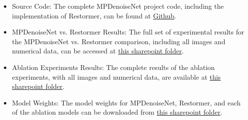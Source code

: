 \begin{itemize}[leftmargin=*]
    \item Source Code: The complete MPDenoiseNet project code, including the implementation of Restormer, can be found at \href{https://github.com/mostafa-k-m/seasalt}{Github}.
    \item MPDenoiseNet vs. Restormer Results: The full set of experimental results for the MPDenoiseNet vs. Restormer comparison, including all images and numerical data, can be accessed at \href{https://nileuniversity-my.sharepoint.com/:u:/g/personal/mos_kamal_nu_edu_eg/ET7VEjGbgyBCiAy7t8YxEIoB9dHZPm5WET6ajmhZCnMP4Q?e=C31VDP}{this sharepoint folder}.
    \item Ablation Experiments Results: The complete results of the ablation experiments, with all images and numerical data, are available at \href{https://nileuniversity-my.sharepoint.com/:u:/g/personal/mos_kamal_nu_edu_eg/EWr7E1_KaRdAmpP2saWx8-MBXGOIvXEuGwPJ4rOI4Cn0ng?e=hwMfvx}{this sharepoint folder}.
    \item Model Weights: The model weights for MPDenoiseNet, Restormer, and each of the ablation models can be downloaded from \href{https://nileuniversity-my.sharepoint.com/:u:/g/personal/mos_kamal_nu_edu_eg/EW8doN45lHNMgRMObz0Ewu0Bn4ZHBWkP47JqUGLgxh1Eag?e=2I4fyicom}{this sharepoint folder}.
\end{itemize}